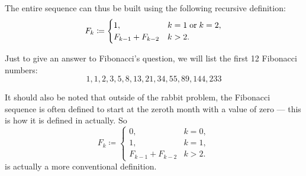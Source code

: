 \begin{example}
  The entire sequence can thus be built using the following recursive definition:
  \begin{equation*}
    F_k \coloneqq \begin{cases}
      1,                &k = 1 \T{or} k = 2, \\
      F_{k-1} + F_{k-2} &k > 2.
    \end{cases}
  \end{equation*}

  Just to give an answer to Fibonacci's question, we will list the first 12 Fibonacci numbers:
  \begin{equation*}
    1, 1, 2, 3, 5, 8, 13, 21, 34, 55, 89, 144, 233
  \end{equation*}

  It should also be noted that outside of the rabbit problem, the Fibonacci sequence is often defined to start at the zeroth month with a value of zero --- this is how it is defined in  actually. So
  \begin{equation}\label{eq:ex:fibonacci_rabbits}
    F_k \coloneqq \begin{cases}
      0,                &k = 0, \\
      1,                &k = 1, \\
      F_{k-1} + F_{k-2} &k > 2.
    \end{cases}
  \end{equation}
  is actually a more conventional definition.
\end{example}
